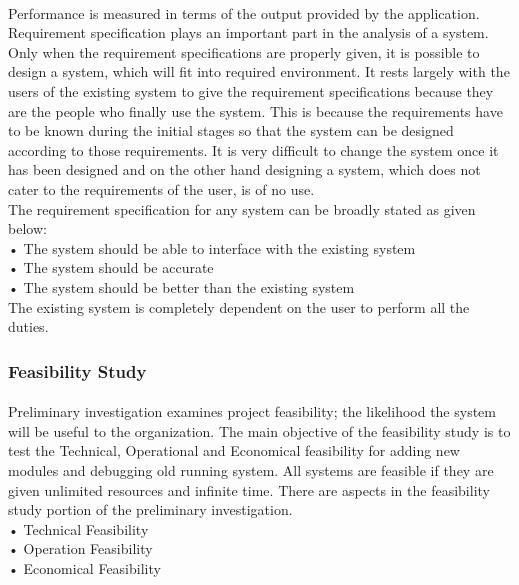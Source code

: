 \paragraph{} Performance is measured in terms of the output provided by the application. Requirement specification plays an important part in the analysis of a system. Only when the requirement specifications are properly given, it is possible to design a system, which will fit into required environment. It rests largely with the users of the existing system to give the requirement specifications because they are the people who finally use the system.  This is because the requirements have to be known during the initial stages so that the system can be designed according to those requirements.  It is very difficult to change the system once it has been designed and on the other hand designing a system, which does not cater to the requirements of the user, is of no use.\\
The requirement specification for any system can be broadly stated as given below: \\ 
•	The system should be able to interface with the existing system \\
•	The system should be accurate\\
•	The system should be better than the existing system\\
The existing system is completely dependent on the user to perform all the duties.

\subsubsection{Feasibility Study}
\paragraph{} Preliminary investigation examines project feasibility; the likelihood the system will be useful to the organization. The main objective of the feasibility study is to test the Technical, Operational and Economical feasibility for adding new modules and debugging old running system. All systems are feasible if they are given unlimited resources and infinite time. There are aspects in the feasibility study portion of the preliminary investigation.\\
•	Technical Feasibility\\
•	Operation Feasibility\\
•	Economical Feasibility\\


